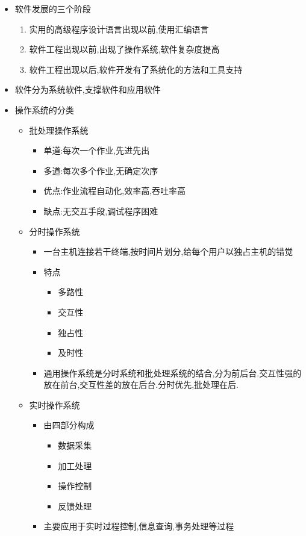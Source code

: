 \documentclass[a4paper,10pt,notitlepage]{article}
\begin{document}
\begin{itemize}
	\item 软件发展的三个阶段
	\begin{enumerate}
		\item 实用的高级程序设计语言出现以前,使用汇编语言
		\item 软件工程出现以前,出现了操作系统,软件复杂度提高
		\item 软件工程出现以后,软件开发有了系统化的方法和工具支持
	\end{enumerate}
	\item 软件分为系统软件,支撑软件和应用软件
	\item 操作系统的分类
	\begin{itemize}
		\item 批处理操作系统
		\begin{itemize}
			\item 单道:每次一个作业,先进先出
			\item 多道:每次多个作业,无确定次序
			\item 优点:作业流程自动化,效率高,吞吐率高
			\item 缺点:无交互手段,调试程序困难
		\end{itemize}
		\item 分时操作系统
		\begin{itemize}
			\item 一台主机连接若干终端,按时间片划分,给每个用户以独占主机的错觉
			\item 特点
			\begin{itemize}
				\item 多路性
				\item 交互性
				\item 独占性
				\item 及时性
			\end{itemize}
			\item 通用操作系统是分时系统和批处理系统的结合,分为前后台.交互性强的放在前台,交互性差的放在后台.分时优先,批处理在后.
		\end{itemize}
		\item 实时操作系统
		\begin{itemize}
			\item 由四部分构成
			\begin{itemize}
				\item 数据采集
				\item 加工处理
				\item 操作控制
				\item 反馈处理
			\end{itemize}
			\item 主要应用于实时过程控制,信息查询,事务处理等过程

\end{itemize}
\end{itemize}
\end{itemize}
\end{document}
